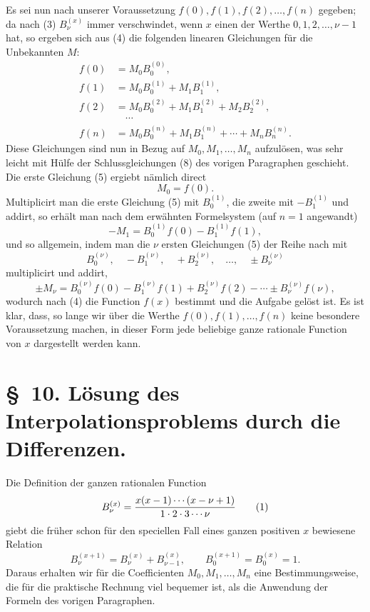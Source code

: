 \documentclass[11pt]{article}
\begin{document}
Es sei nun nach unserer Voraussetzung $f(0),f(1),f(2),\ldots,f(n)$ gegeben; da nach (3) $B_\nu^{(x)}$ immer verschwindet, wenn $x$ einen der Werthe $0,1,2,\ldots,\nu-1$ hat, so ergeben sich aus (4) die folgenden linearen Gleichungen für die Unbekannten $M$:
\begin{equation}
\begin{aligned}
 f(0)&=M_0B_0^{(0)},\\
 f(1)&=M_0B_0^{(1)}+M_1B_1^{(1)},\\
 f(2)&=M_0B_0^{(2)}+M_1B_1^{(2)}+M_2B_2^{(2)},\\
 &\quad\cdots\\
 f(n)&=M_0B_0^{(n)}+M_1B_1^{(n)}+\cdots+M_nB_n^{(n)}.
\end{aligned}
\tag{5}
\end{equation}
Diese Gleichungen sind nun in Bezug auf $M_0,M_1,\ldots,M_n$ aufzulösen, was sehr leicht mit Hülfe der Schlussgleichungen (8) des vorigen Paragraphen geschieht. Die erste Gleichung (5) ergiebt nämlich direct
\begin{equation}
 M_0=f(0).
\tag{6}
\end{equation}
Multiplicirt man die erste Gleichung (5) mit $B_0^{(1)}$, die zweite mit $-B_1^{(1)}$ und addirt, so erhält man nach dem erwähnten Formelsystem (auf $n=1$ angewandt)
\[
 -M_1=B_0^{(1)}f(0)-B_1^{(1)}f(1),
\]
und so allgemein, indem man die $\nu$ ersten Gleichungen (5) der Reihe nach mit
\[
 B_0^{(\nu)},\quad -B_1^{(\nu)},\quad +B_2^{(\nu)},\quad \ldots,\quad \pm B_\nu^{(\nu)}
\]
multiplicirt und addirt,
\begin{equation}
 \pm M_\nu=B_0^{(\nu)}f(0)-B_1^{(\nu)}f(1)+B_2^{(\nu)}f(2)-\cdots\pm B_\nu^{(\nu)}f(\nu),
\tag{7}
\end{equation}
wodurch nach (4) die Function $f(x)$ bestimmt und die Aufgabe gelöst ist. Es ist klar, dass, so lange wir über die Werthe $f(0),f(1),\ldots,f(n)$ keine besondere Voraussetzung machen, in dieser Form jede beliebige ganze rationale Function von $x$ dargestellt werden kann.

\section*{\S~10. Lösung des Interpolationsproblems durch die Differenzen.}

Die Definition der ganzen rationalen Function
\begin{equation}
 B_\nu^{(x)}={x(x-1)\cdots(x-\nu+1)\over 1\cdot2\cdot3\cdots\nu}
\tag{1}
\end{equation}
giebt die früher schon für den speciellen Fall eines ganzen positiven $x$ bewiesene Relation
\begin{equation}
 B_\nu^{(x+1)}=B_\nu^{(x)}+B_{\nu-1}^{(x)},\qquad B_0^{(x+1)}=B_0^{(x)}=1.
\tag{2}
\end{equation}
Daraus erhalten wir für die Coefficienten $M_0,M_1,\ldots,M_n$ eine Bestimmungsweise, die für die praktische Rechnung viel bequemer ist, als die Anwendung der Formeln des vorigen Paragraphen.
\end{document}
